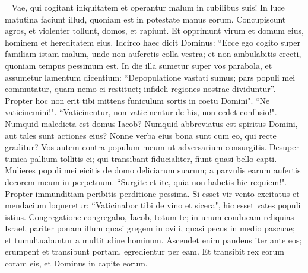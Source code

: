 \begin{biblechapter}   
\verse Vae, qui cogitant iniquitatem et operantur malum in cubilibus suis! In luce matutina faciunt illud, quoniam est in potestate manus eorum. 
\verse Concupiscunt agros, et violenter tollunt, domos, et rapiunt. Et opprimunt virum et domum eius, hominem et hereditatem eius. 
\verse Idcirco haec dicit Dominus: “Ecce ego cogito super familiam istam malum, unde non auferetis colla vestra; et non ambulabitis erecti, quoniam tempus pessimum est. 
\verse In die illa sumetur super vos parabola, et assumetur lamentum dicentium: “Depopulatione vastati sumus; pars populi mei commutatur, quam nemo ei restituet; infideli regiones nostrae dividuntur”. 
\verse Propter hoc non erit tibi mittens funiculum sortis in coetu Domini". 
\verse “Ne vaticinemini!". “Vaticinentur, non vaticinentur de his, non cedet confusio!". 
\verse Numquid maledicta est domus Iacob? Numquid abbreviatus est spiritus Domini, aut tales sunt actiones eius? Nonne verba eius bona sunt cum eo, qui recte graditur? 
\verse Vos autem contra populum meum ut adversarium consurgitis. Desuper tunica pallium tollitis ei; qui transibant fiducialiter, fiunt quasi bello capti. 
\verse Mulieres populi mei eicitis de domo deliciarum suarum; a parvulis earum aufertis decorem meum in perpetuum. 
\verse “Surgite et ite, quia non habetis hic requiem!". Propter immunditiam peribitis perditione pessima. 
\verse Si esset vir vento excitatus et mendacium loqueretur: “Vaticinabor tibi de vino et sicera", hic esset vates populi istius. 
\verse Congregatione congregabo, Iacob, totum te; in unum conducam reliquias Israel, pariter ponam illum quasi gregem in ovili, quasi pecus in medio pascuae; et tumultuabuntur a multitudine hominum. 
\verse Ascendet enim pandens iter ante eos; erumpent et transibunt portam, egredientur per eam. Et transibit rex eorum coram eis, et Dominus in capite eorum. 
\end{biblechapter}


